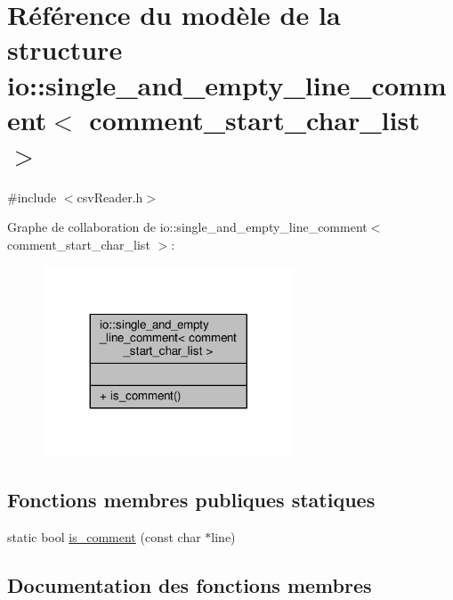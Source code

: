 \hypertarget{structio_1_1single__and__empty__line__comment}{}\section{Référence du modèle de la structure io\+:\+:single\+\_\+and\+\_\+empty\+\_\+line\+\_\+comment$<$ comment\+\_\+start\+\_\+char\+\_\+list $>$}
\label{structio_1_1single__and__empty__line__comment}


{\ttfamily \#include $<$csv\+Reader.\+h$>$}



Graphe de collaboration de io\+:\+:single\+\_\+and\+\_\+empty\+\_\+line\+\_\+comment$<$ comment\+\_\+start\+\_\+char\+\_\+list $>$\+:\nopagebreak
\begin{figure}[H]
\begin{center}
\leavevmode
\includegraphics[width=212pt]{structio_1_1single__and__empty__line__comment__coll__graph}
\end{center}
\end{figure}
\subsection*{Fonctions membres publiques statiques}
\begin{DoxyCompactItemize}
\item 
static bool \hyperlink{structio_1_1single__and__empty__line__comment_a93a1556dfe4d7e6e3a674d576c4b30f4}{is\+\_\+comment} (const char $\ast$line)
\end{DoxyCompactItemize}


\subsection{Documentation des fonctions membres}
\mbox{\label{structio_1_1single__and__empty__line__comment_a93a1556dfe4d7e6e3a674d576c4b30f4}} 
